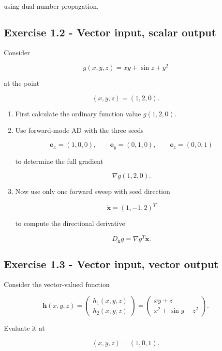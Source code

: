 \documentclass{course_sheet}
\begin{document}
using dual-number propagation.

\subsection*{Exercise 1.2 - Vector input, scalar output}
Consider

\[
g(x,y,z)=xy+\sin z+y^2
\]

at the point

\[
(x,y,z)=(1,2,0).
\]

\begin{enumerate}
\item
First calculate the ordinary function value $g(1,2,0)$.

\item
Use forward-mode AD with the three seeds

\[
\mathbf{e}_x=(1,0,0),
   \qquad
   \mathbf{e}_y=(0,1,0),
   \qquad
   \mathbf{e}_z=(0,0,1)
\]

to determine the full gradient

\[
\nabla g(1,2,0).
\]

\item
Now use only one forward sweep with seed direction

\[
\dot{\mathbf{x}}=(1,-1,2)^T
\]

to compute the directional derivative

\[
D_{\dot{\mathbf{x}}}g
   =
   \nabla g^T\dot{\mathbf{x}}.
\]

\end{enumerate}
\subsection*{Exercise 1.3 - Vector input, vector output}
Consider the vector-valued function

\[
\mathbf{h}(x,y,z)
=
\begin{pmatrix}
 h_1(x,y,z)\\
 h_2(x,y,z)
\end{pmatrix}
=
\begin{pmatrix}
 xy+z\\
 x^2+\sin y-z^2
\end{pmatrix}.
\]

Evaluate it at

\[
(x,y,z)=(1,0,1).
\]
\end{document}
